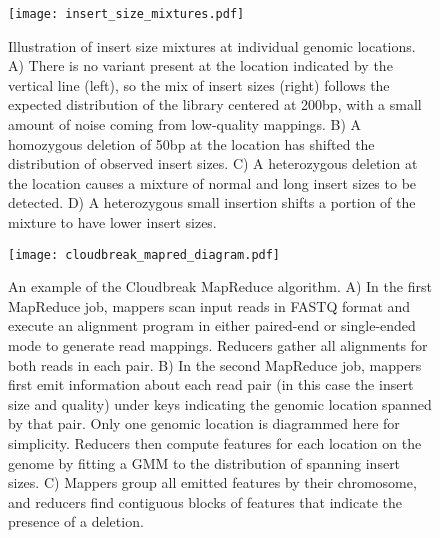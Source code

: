 \documentclass[11pt]{article}
\begin{document}
\printbibliography


\setcounter{table}{1}
\setcounter{figure}{0}
\renewcommand{\figurename}{Supplementary Figure}
\renewcommand{\tablename}{Supplementary Table}


\newrefsection


\begin{figure}
\centering
\texttt{[image: insert\_size\_mixtures.pdf]}
\caption{Illustration of insert size mixtures at individual genomic locations. A) There is no variant present at the location indicated by the vertical line (left), so the mix of insert sizes (right) follows the expected distribution of the library centered at 200bp, with a small amount of noise coming from low-quality mappings. B) A homozygous deletion of 50bp at the location has shifted the distribution of observed insert sizes. C) A heterozygous deletion at the location causes a mixture of normal and long insert sizes to be detected. D) A heterozygous small insertion shifts a portion of the mixture to have lower insert sizes.}
\label{insert_size_mixes}
\end{figure}

\clearpage

\begin{figure}[h]
\centering
\texttt{[image: cloudbreak\_mapred\_diagram.pdf]}
\caption{An example of the Cloudbreak MapReduce algorithm. A) In the first MapReduce job, mappers scan input reads in FASTQ format and execute an alignment program in either paired-end or single-ended mode to generate read mappings. Reducers gather all alignments for both reads in each pair. B) In the second MapReduce job, mappers first emit information about each read pair (in this case the insert size and quality) under keys indicating the genomic location spanned by that pair. Only one genomic location is diagrammed here for simplicity. Reducers then compute features for each location on the genome by fitting a GMM to the distribution of spanning insert sizes. C) Mappers group all emitted features by their chromosome, and reducers find contiguous blocks of features that indicate the presence of a deletion.}
\label{algorithm_example}
\end{figure}

\clearpage
\end{document}
